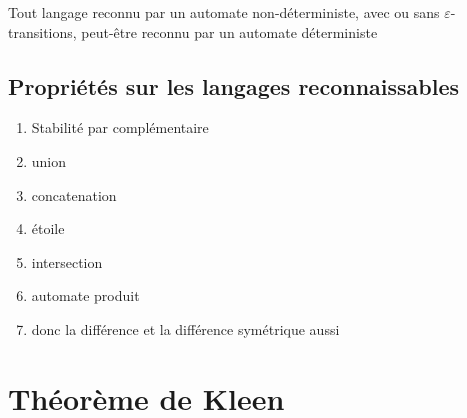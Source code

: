 \begin{proposition}{}{}
    Tout langage reconnu par un automate non-déterministe, avec ou sans $\varepsilon$-transitions,
    peut-être reconnu par un automate déterministe
\end{proposition}

\subsection{Propriétés sur les langages reconnaissables}
\begin{enumerate}
    \item Stabilité par complémentaire
    \item union
    \item concatenation
    \item étoile
    \item intersection
    \item automate produit
    \item donc la différence et la différence symétrique aussi
\end{enumerate}

\section{Théorème de Kleen}